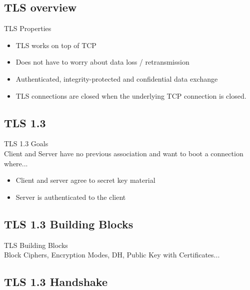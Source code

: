 \subsection{TLS overview}

\begin{concept}{TLS Properties}\\
    \begin{itemize}
        \item TLS works on top of TCP
        \item Does not have to worry about data loss / retransmission
        \item Authenticated, integrity-protected and confidential data exchange
        \item TLS connections are closed when the underlying TCP connection is closed.
    \end{itemize}
\end{concept}

\subsection{TLS 1.3}

\begin{concept}{TLS 1.3 Goals}\\
    Client and Server have no previous association and want to boot a connection where...
    \begin{itemize}
        \item Client and server agree to secret key material
        \item Server is authenticated to the client
    \end{itemize}
\end{concept}

\subsection{TLS 1.3 Building Blocks}

\begin{concept}{TLS Building Blocks}\\
    Block Ciphers, Encryption Modes, DH, Public Key with Certificates...
\end{concept}

\subsection{TLS 1.3 Handshake}

